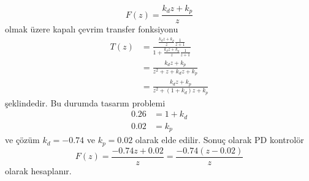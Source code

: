 \begin{enumerate}[\bfseries S1.]
\begin{equation}
        F(z)=\frac{k_dz+k_p}{z}
    \end{equation}
    olmak üzere kapalı çevrim transfer fonksiyonu
    \begin{equation}
    \begin{split}
        T(z)&=\frac{\frac{k_dz+k_p}{z}\frac{1}{z+1}}{1+\frac{k_dz+k_p}{z}\frac{1}{z+1}}\\
        &=\frac{k_dz+k_p}{z^2+z+k_dz+k_p}\\
        &=\frac{k_dz+k_p}{z^2+(1+k_d)z+k_p}
    \end{split}
    \end{equation}
    şeklindedir. Bu durumda tasarım problemi
    \begin{equation}
        \begin{split}
        0.26 &= 1+ k_d\\
        0.02 &= k_p
        \end{split}
    \end{equation}
    ve çözüm $k_d=-0.74$ ve $k_p=0.02$ olarak elde edilir. Sonuç olarak PD kontrolör
    \begin{equation}
        F(z)=\frac{-0.74z+0.02}{z}=\frac{-0.74(z-0.02)}{z}
    \end{equation}
    olarak hesaplanır.


\end{enumerate}
